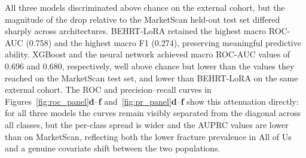 \documentclass[12pt]{article}
\begin{document}
All three models discriminated above chance on the external cohort, but the magnitude of the drop relative to the MarketScan held-out test set differed sharply across architectures. BEHRT-LoRA retained the highest macro ROC-AUC (0.758) and the highest macro F1 (0.274), preserving meaningful predictive ability. XGBoost and the neural network achieved macro ROC-AUC values of 0.696 and 0.680, respectively, well above chance but lower than the values they reached on the MarketScan test set, and lower than BEHRT-LoRA on the same external cohort. The ROC and precision--recall curves in Figures~\ref{fig:roc_panel}\textbf{d}--\textbf{f} and~\ref{fig:pr_panel}\textbf{d}--\textbf{f} show this attenuation directly: for all three models the curves remain visibly separated from the diagonal across all classes, but the per-class spread is wider and the AUPRC values are lower than on MarketScan, reflecting both the lower fracture prevalence in All of Us and a genuine covariate shift between the two populations.
\end{document}
